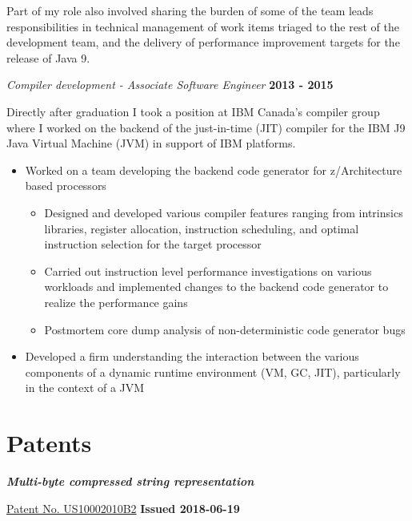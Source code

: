 \documentclass[margin,line]{res}
\begin{document}
\begin{resume}
\newpage

Part of my role also involved sharing the burden of some of the team leads responsibilities in technical management of
work items triaged to the rest of the development team, and the delivery of performance improvement targets for the
release of Java 9.

{\em Compiler development - Associate Software Engineer} \hfill {\bf 2013 - 2015}
\vspace{-.12in}

Directly after graduation I took a position at IBM Canada's compiler group where I worked on the backend of the
just-in-time (JIT) compiler for the IBM J9 Java Virtual Machine (JVM) in support of IBM platforms.

\vspace{.10in}

\begin{itemize}
\item Worked on a team developing the backend code generator for z/Architecture based processors
\begin{itemize}
\item Designed and developed various compiler features ranging from intrinsics libraries, register allocation,
instruction scheduling, and optimal instruction selection for the target processor
\item Carried out instruction level performance investigations on various workloads and implemented changes to
the backend code generator to realize the performance gains
\item Postmortem core dump analysis of non-deterministic code generator bugs
\end{itemize}
\item Developed a firm understanding the interaction between the various components of a dynamic runtime 
environment (VM, GC, JIT), particularly in the context of a JVM
\end{itemize}

\section{\sc Patents}

\begin{list}{}{\leftmargin=0cm}
\item {\em \bf Multi-byte compressed string representation}

\href{https://patents.google.com/patent/US10002010B2}{Patent No. US10002010B2} \hfill {\bf Issued 2018-06-19}


\end{list}
\end{resume}
\end{document}
